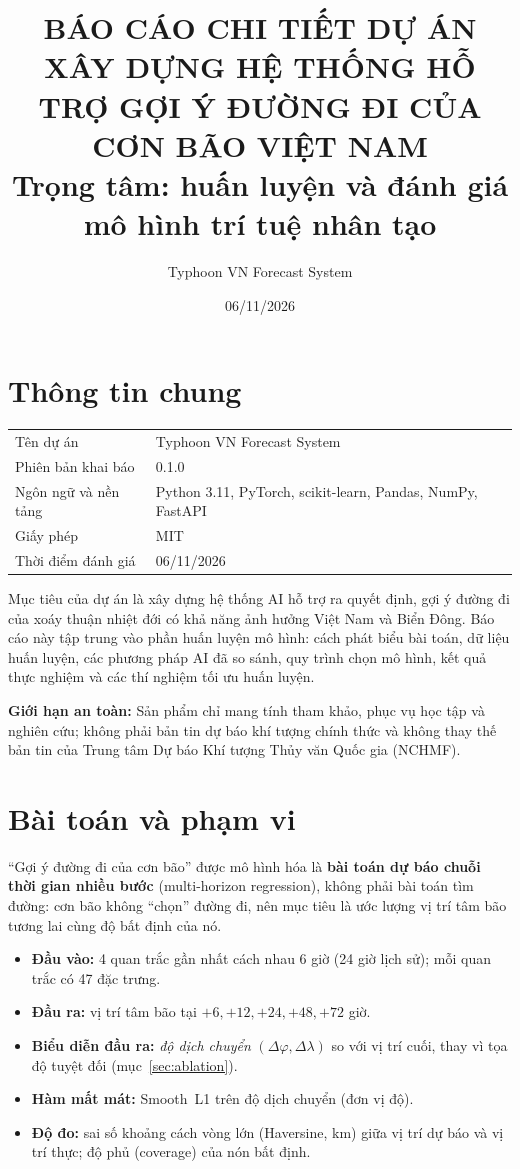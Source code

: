 \documentclass[12pt,a4paper]{article}
\title{\textbf{BÁO CÁO CHI TIẾT DỰ ÁN}\\[4pt]
\large XÂY DỰNG HỆ THỐNG HỖ TRỢ GỢI Ý ĐƯỜNG ĐI CỦA CƠN BÃO VIỆT NAM\\[2pt]
\normalsize Trọng tâm: huấn luyện và đánh giá mô hình trí tuệ nhân tạo}
\author{Typhoon VN Forecast System}
\date{06/11/2026}
\begin{document}
\maketitle

\section{Thông tin chung}
\begin{tabular}{@{}ll@{}}
Tên dự án & Typhoon VN Forecast System \\
Phiên bản khai báo & 0.1.0 \\
Ngôn ngữ và nền tảng & Python 3.11, PyTorch, scikit-learn, Pandas, NumPy, FastAPI \\
Giấy phép & MIT \\
Thời điểm đánh giá & 06/11/2026 \\
\end{tabular}

\medskip
Mục tiêu của dự án là xây dựng hệ thống AI hỗ trợ ra quyết định, gợi ý đường đi
của xoáy thuận nhiệt đới có khả năng ảnh hưởng Việt Nam và Biển Đông. Báo cáo này
tập trung vào phần huấn luyện mô hình: cách phát biểu bài toán, dữ liệu huấn luyện,
các phương pháp AI đã so sánh, quy trình chọn mô hình, kết quả thực nghiệm và
các thí nghiệm tối ưu huấn luyện.

\textbf{Giới hạn an toàn:} Sản phẩm chỉ mang tính tham khảo, phục vụ học tập và
nghiên cứu; không phải bản tin dự báo khí tượng chính thức và không thay thế bản
tin của Trung tâm Dự báo Khí tượng Thủy văn Quốc gia (NCHMF).

\section{Bài toán và phạm vi}
``Gợi ý đường đi của cơn bão'' được mô hình hóa là \textbf{bài toán dự báo chuỗi
thời gian nhiều bước} (multi-horizon regression), không phải bài toán tìm đường:
cơn bão không ``chọn'' đường đi, nên mục tiêu là ước lượng vị trí tâm bão tương lai
cùng độ bất định của nó.

\begin{itemize}
  \item \textbf{Đầu vào:} 4 quan trắc gần nhất cách nhau 6 giờ (24 giờ lịch sử);
        mỗi quan trắc có 47 đặc trưng.
  \item \textbf{Đầu ra:} vị trí tâm bão tại $+6, +12, +24, +48, +72$ giờ.
  \item \textbf{Biểu diễn đầu ra:} \emph{độ dịch chuyển} $(\Delta\varphi, \Delta\lambda)$
        so với vị trí cuối, thay vì tọa độ tuyệt đối (mục~\ref{sec:ablation}).
  \item \textbf{Hàm mất mát:} Smooth~L1 trên độ dịch chuyển (đơn vị độ).
  \item \textbf{Độ đo:} sai số khoảng cách vòng lớn (Haversine, km) giữa vị trí dự
        báo và vị trí thực; độ phủ (coverage) của nón bất định.
\end{itemize}
\end{document}
